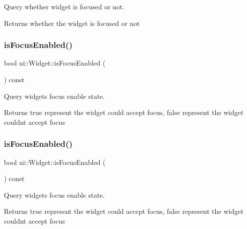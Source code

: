 Query whether widget is focused or not. \begin{DoxyReturn}{Returns}
whether the widget is focused or not 
\end{DoxyReturn}
\mbox{\label{classui_1_1Widget_ad8fd665970343c600150eef5a0646126}} 
\subsubsection{\texorpdfstring{is\+Focus\+Enabled()}{isFocusEnabled()}\hspace{0.1cm}{\footnotesize\ttfamily [1/2]}}
{\footnotesize\ttfamily bool ui\+::\+Widget\+::is\+Focus\+Enabled (\begin{DoxyParamCaption}{ }\end{DoxyParamCaption}) const}

Query widget\textquotesingle{}s focus enable state. \begin{DoxyReturn}{Returns}
true represent the widget could accept focus, false represent the widget couldn\textquotesingle{}t accept focus 
\end{DoxyReturn}
\mbox{\label{classui_1_1Widget_ad8fd665970343c600150eef5a0646126}} 
\subsubsection{\texorpdfstring{is\+Focus\+Enabled()}{isFocusEnabled()}\hspace{0.1cm}{\footnotesize\ttfamily [2/2]}}
{\footnotesize\ttfamily bool ui\+::\+Widget\+::is\+Focus\+Enabled (\begin{DoxyParamCaption}{ }\end{DoxyParamCaption}) const}

Query widget\textquotesingle{}s focus enable state. \begin{DoxyReturn}{Returns}
true represent the widget could accept focus, false represent the widget couldn\textquotesingle{}t accept focus 
\end{DoxyReturn}
\mbox{\label{classui_1_1Widget_ae95900edba414cdf224bdd528de84091}} 
